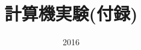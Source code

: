 \documentclass[dvipdfmx]{beamer}
\title{計算機実験(付録)}
\date{2016}
\begin{document}
\begin{frame}
  \titlepage
  \tableofcontents
\end{frame}






\end{document}
